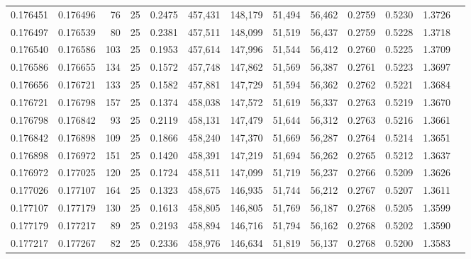 \begin{tabular}{rrrrrrrrrrrrr}
0.176451 & 0.176496 &    76 &  25 &                                     0.2475 & 457,431 & 148,179 &  51,494 &  56,462 & 0.2759 & 0.5230 & 1.3726 \\
0.176497 & 0.176539 &    80 &  25 &                                     0.2381 & 457,511 & 148,099 &  51,519 &  56,437 & 0.2759 & 0.5228 & 1.3718 \\
0.176540 & 0.176586 &   103 &  25 &                                     0.1953 & 457,614 & 147,996 &  51,544 &  56,412 & 0.2760 & 0.5225 & 1.3709 \\
0.176586 & 0.176655 &   134 &  25 &                                     0.1572 & 457,748 & 147,862 &  51,569 &  56,387 & 0.2761 & 0.5223 & 1.3697 \\
0.176656 & 0.176721 &   133 &  25 &                                     0.1582 & 457,881 & 147,729 &  51,594 &  56,362 & 0.2762 & 0.5221 & 1.3684 \\
0.176721 & 0.176798 &   157 &  25 &                                     0.1374 & 458,038 & 147,572 &  51,619 &  56,337 & 0.2763 & 0.5219 & 1.3670 \\
0.176798 & 0.176842 &    93 &  25 &                                     0.2119 & 458,131 & 147,479 &  51,644 &  56,312 & 0.2763 & 0.5216 & 1.3661 \\
0.176842 & 0.176898 &   109 &  25 &                                     0.1866 & 458,240 & 147,370 &  51,669 &  56,287 & 0.2764 & 0.5214 & 1.3651 \\
0.176898 & 0.176972 &   151 &  25 &                                     0.1420 & 458,391 & 147,219 &  51,694 &  56,262 & 0.2765 & 0.5212 & 1.3637 \\
0.176972 & 0.177025 &   120 &  25 &                                     0.1724 & 458,511 & 147,099 &  51,719 &  56,237 & 0.2766 & 0.5209 & 1.3626 \\
0.177026 & 0.177107 &   164 &  25 &                                     0.1323 & 458,675 & 146,935 &  51,744 &  56,212 & 0.2767 & 0.5207 & 1.3611 \\
0.177107 & 0.177179 &   130 &  25 &                                     0.1613 & 458,805 & 146,805 &  51,769 &  56,187 & 0.2768 & 0.5205 & 1.3599 \\
0.177179 & 0.177217 &    89 &  25 &                                     0.2193 & 458,894 & 146,716 &  51,794 &  56,162 & 0.2768 & 0.5202 & 1.3590 \\
0.177217 & 0.177267 &    82 &  25 &                                     0.2336 & 458,976 & 146,634 &  51,819 &  56,137 & 0.2768 & 0.5200 & 1.3583 \\

\end{tabular}
